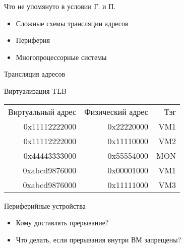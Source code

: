 \documentclass{beamer}
\begin{document}
\begin{frame}{Что не упомянуто в условии Г. и П.}

\begin{itemize}
    \item Сложные схемы трансляции адресов
    \item Периферия
    \item Многопроцессорные системы
\end{itemize}
\end{frame}

\begin{frame}[shrink=20]{Трансляция адресов}
\centering
 
\end{frame}

\begin{frame}{Виртуализация TLB}
\begin{center}
\begin{tabular}{rrr}
Виртуальный адрес & Физический адрес & Тэг\\
0x11112222000 &  0x22220000 & VM1\\
0x11112222000 &  0x11110000 & VM2\\
0x44443333000 &  0x55554000 & MON\\
0xabcd9876000 &  0x00001000 & VM1\\
0xabcd9876000 &  0x11111000 & VM3
 \end{tabular}
\end{center}
\end{frame}

\begin{frame}{Периферийные устройства}
\begin{itemize}
    \item Кому доставлять прерывание?
    \item Что делать, если прерывания внутри ВМ запрещены?
\end{itemize}

\vfill
\centering
{}

\end{frame}
\end{document}

